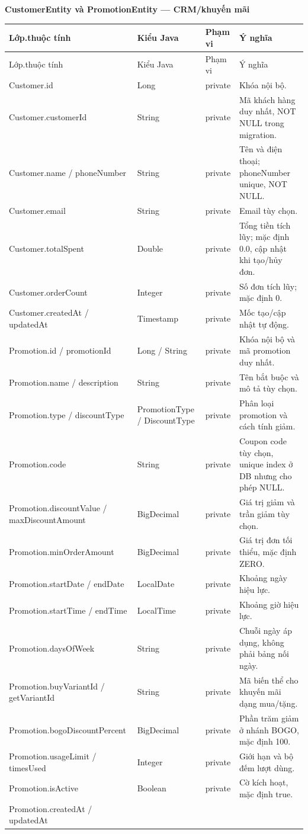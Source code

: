 \documentclass[12pt,a4paper,oneside]{report}
\newcommand{\ClassTableTitle}[1]{\par\medskip\noindent\textbf{#1}\par\smallskip}
\begin{document}
\ClassTableTitle{CustomerEntity và PromotionEntity — CRM/khuyến mãi}
\small\begin{longtable}{@{}D{3.25cm}D{3.35cm}D{1.35cm}D{6.75cm}@{}}\toprule Lớp.thuộc tính & Kiểu Java & Phạm vi & Ý nghĩa\\\midrule\endfirsthead\toprule Lớp.thuộc tính & Kiểu Java & Phạm vi & Ý nghĩa\\\midrule\endhead\bottomrule\endfoot
Customer.\allowbreak id & Long & private & Khóa nội bộ.\\Customer.\allowbreak customerId & String & private & Mã khách hàng duy nhất, NOT NULL trong migration.\\Customer.\allowbreak name / phoneNumber & String & private & Tên và điện thoại; phoneNumber unique, NOT NULL.\\Customer.\allowbreak email & String & private & Email tùy chọn.\\Customer.\allowbreak totalSpent & Double & private & Tổng tiền tích lũy; mặc định 0.0, cập nhật khi tạo/hủy đơn.\\Customer.\allowbreak orderCount & Integer & private & Số đơn tích lũy; mặc định 0.\\Customer.\allowbreak createdAt / updatedAt & Timestamp & private & Mốc tạo/cập nhật tự động.\\Promotion.\allowbreak id / promotionId & Long / String & private & Khóa nội bộ và mã promotion duy nhất.\\Promotion.\allowbreak name / description & String & private & Tên bắt buộc và mô tả tùy chọn.\\Promotion.\allowbreak type / discountType & PromotionType / DiscountType & private & Phân loại promotion và cách tính giảm.\\Promotion.\allowbreak code & String & private & Coupon code tùy chọn, unique index ở DB nhưng cho phép NULL.\\Promotion.\allowbreak discountValue / maxDiscountAmount & BigDecimal & private & Giá trị giảm và trần giảm tùy chọn.\\Promotion.\allowbreak minOrderAmount & BigDecimal & private & Giá trị đơn tối thiểu, mặc định ZERO.\\Promotion.\allowbreak startDate / endDate & LocalDate & private & Khoảng ngày hiệu lực.\\Promotion.\allowbreak startTime / endTime & LocalTime & private & Khoảng giờ hiệu lực.\\Promotion.\allowbreak daysOfWeek & String & private & Chuỗi ngày áp dụng, không phải bảng nối ngày.\\Promotion.\allowbreak buyVariantId / getVariantId & String & private & Mã biến thể cho khuyến mãi dạng mua/tặng.\\Promotion.\allowbreak bogoDiscountPercent & BigDecimal & private & Phần trăm giảm ở nhánh BOGO, mặc định 100.\\Promotion.\allowbreak usageLimit / timesUsed & Integer & private & Giới hạn và bộ đếm lượt dùng.\\Promotion.\allowbreak isActive & Boolean & private & Cờ kích hoạt, mặc định true.\\Promotion.\allowbreak createdAt / updatedAt & 
\end{longtable}
\end{document}
